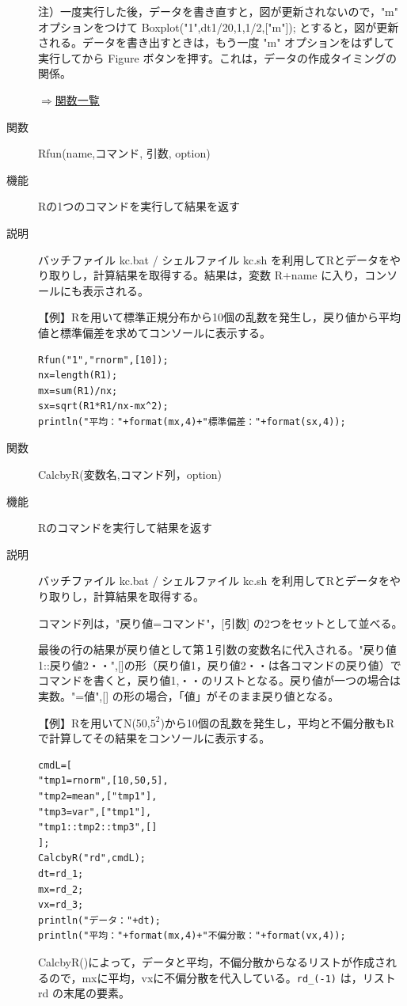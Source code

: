 \documentclass[papersize,a4paper,10pt,uplatex]{jsarticle}
\begin{document}
\begin{description}
注）一度実行した後，データを書き直すと，図が更新されないので，"m" オプションをつけて
Boxplot("1",dt1/20,1,1/2,["m"]); とすると，図が更新される。データを書き出すときは，もう一度 "m" オプションをはずして実行してから Figure ボタンを押す。これは，データの作成タイミングの関係。

\begin{flushright}\hyperlink{functionlist}{$\Rightarrow$関数一覧}\end{flushright}

\hypertarget{rfun}{}
\item[関数]Rfun(name,コマンド, 引数, option)
\item[機能]Rの1つのコマンドを実行して結果を返す
\item[説明]バッチファイル kc.bat / シェルファイル kc.sh を利用してRとデータをやり取りし，計算結果を取得する。結果は，変数 R+name に入り，コンソールにも表示される。

\vspace{\baselineskip}
【例】Rを用いて標準正規分布から10個の乱数を発生し，戻り値から平均値と標準偏差を求めてコンソールに表示する。
\begin{verbatim}
Rfun("1","rnorm",[10]);
nx=length(R1);
mx=sum(R1)/nx;
sx=sqrt(R1*R1/nx-mx^2);
println("平均："+format(mx,4)+"標準偏差："+format(sx,4));
\end{verbatim}

\hypertarget{calcbyr}{}
\item[関数]CalcbyR(変数名,コマンド列，option)
\item[機能]Rのコマンドを実行して結果を返す
\item[説明]バッチファイル kc.bat / シェルファイル kc.sh を利用してRとデータをやり取りし，計算結果を取得する。

コマンド列は，"戻り値=コマンド"，[引数] の2つをセットとして並べる。

最後の行の結果が戻り値として第１引数の変数名に代入される。"戻り値1::戻り値2・・",[]の形（戻り値1，戻り値2・・は各コマンドの戻り値）でコマンドを書くと，戻り値1,・・のリストとなる。戻り値が一つの場合は実数。"=値",[] の形の場合，「値」がそのまま戻り値となる。

\vspace{\baselineskip}
【例】Rを用いてN(50,$5^2$)から10個の乱数を発生し，平均と不偏分散もRで計算してその結果をコンソールに表示する。
\begin{verbatim}
cmdL=[
"tmp1=rnorm",[10,50,5],
"tmp2=mean",["tmp1"],
"tmp3=var",["tmp1"],
"tmp1::tmp2::tmp3",[]
];
CalcbyR("rd",cmdL);
dt=rd_1;
mx=rd_2;
vx=rd_3;
println("データ："+dt);
println("平均："+format(mx,4)+"不偏分散："+format(vx,4));
\end{verbatim}
CalcbyR()によって，データと平均，不偏分散からなるリストが作成されるので，mxに平均，vxに不偏分散を代入している。\verb|rd_(-1)| は，リスト rd の末尾の要素。


\end{description}
\end{document}
